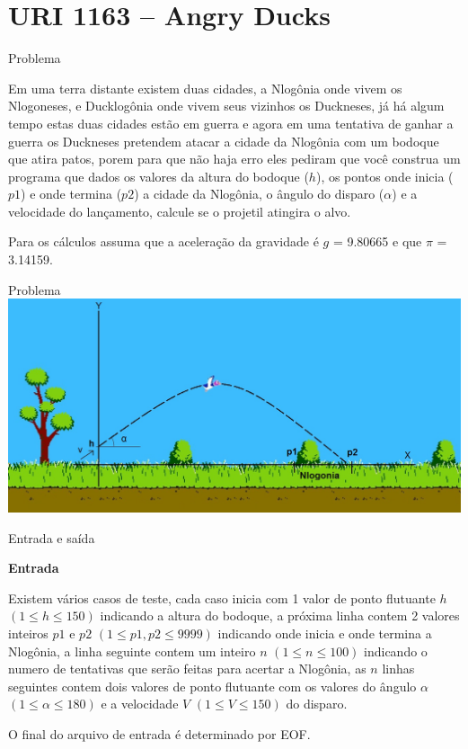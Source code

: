 \section{URI 1163 -- Angry Ducks}

\begin{frame}[fragile]{Problema}

Em uma terra distante existem duas cidades, a Nlogônia onde vivem os Nlogoneses, e Ducklogônia onde vivem seus vizinhos os Duckneses, já há algum tempo estas duas cidades estão em guerra e agora em uma tentativa de ganhar a guerra os Duckneses pretendem atacar a cidade da Nlogônia com um bodoque que atira patos, porem para que não haja erro eles pediram que você construa um programa que dados os valores da altura do bodoque ($h$), os pontos onde inicia ($p1$) e onde termina ($p2$) a cidade da Nlogônia, o ângulo do disparo ($\alpha$) e a velocidade do lançamento, calcule se o projetil atingira o alvo.

Para os cálculos assuma que a aceleração da gravidade é $g$ = 9.80665 e que $\pi$ = 3.14159.
\end{frame}

\begin{frame}[fragile]{Problema}
    \includegraphics[scale=0.25,center]{UOJ_1163.jpg}
\end{frame}

\begin{frame}[fragile]{Entrada e saída}

\textbf{Entrada}

Existem vários casos de teste, cada caso inicia com 1 valor de ponto flutuante $h$ $(1 \leq h \leq 150)$ indicando a altura do bodoque, a próxima linha contem 2 valores inteiros $p1$ e $p2$ $(1 \leq p1, p2 \leq 9999)$ indicando onde inicia e onde termina a Nlogônia, a linha seguinte contem um inteiro $n$ $(1 \leq n \leq 100)$ indicando o numero de tentativas que serão feitas para acertar a Nlogônia, as $n$ linhas seguintes contem dois valores de ponto flutuante com os valores do ângulo $\alpha$ $(1 \leq \alpha \leq 180)$ e a velocidade $V$ $(1 \leq V \leq 150)$ do disparo.

O final do arquivo de entrada é determinado por EOF.
\end{frame}

